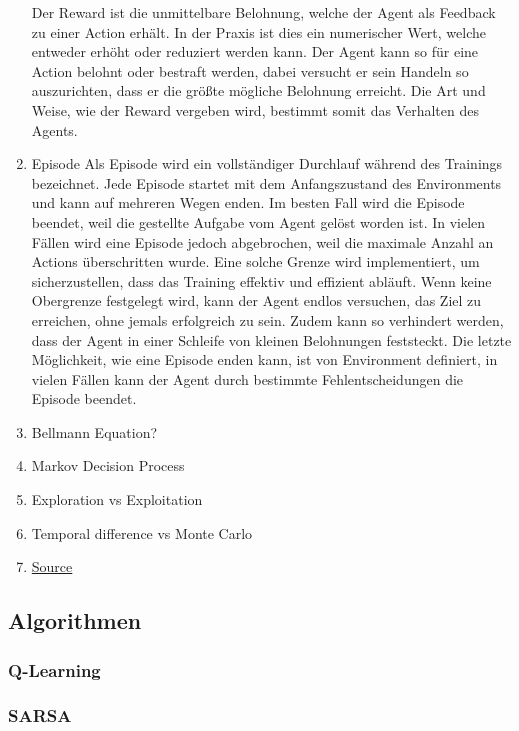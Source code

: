 \begin{enumerate}
    Der Reward ist die unmittelbare Belohnung, welche der Agent als Feedback zu einer Action erhält. In der Praxis ist dies ein numerischer Wert, welche entweder erhöht oder reduziert werden kann. Der Agent kann so für eine Action belohnt oder bestraft werden, dabei versucht er sein Handeln so auszurichten, dass er die größte mögliche Belohnung erreicht. Die Art und Weise, wie der Reward vergeben wird, bestimmt somit das Verhalten des Agents.
    \item Episode
    Als Episode wird ein vollständiger Durchlauf während des Trainings bezeichnet. Jede Episode startet mit dem Anfangszustand des Environments und kann auf mehreren Wegen enden. Im besten Fall wird die Episode beendet, weil die gestellte Aufgabe vom Agent gelöst worden ist. In vielen Fällen wird eine Episode jedoch abgebrochen, weil die maximale Anzahl an Actions überschritten wurde. Eine solche Grenze wird implementiert, um sicherzustellen, dass das Training effektiv und effizient abläuft. Wenn keine Obergrenze festgelegt wird, kann der Agent endlos versuchen, das Ziel zu erreichen, ohne jemals erfolgreich zu sein. Zudem kann so verhindert werden, dass der Agent in einer Schleife von kleinen Belohnungen feststeckt. Die letzte Möglichkeit, wie eine Episode enden kann, ist von Environment definiert, in vielen Fällen kann der Agent durch bestimmte Fehlentscheidungen die Episode beendet.
    \item Bellmann Equation?
    \item Markov Decision Process
    \item Exploration vs Exploitation
    \item Temporal difference vs Monte Carlo
    \item \href{https://blog.floydhub.com/an-introduction-to-q-learning-reinforcement-learning/}{Source} 
\end{enumerate}

\subsection{Algorithmen}

\subsubsection{Q-Learning}

\subsubsection{SARSA}

